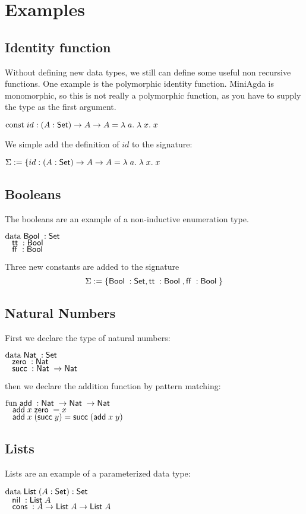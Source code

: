 \section{Examples}
\subsection{Identity function}
Without defining new data types, we still can define some useful non recursive functions.
One example is the polymorphic identity function. 
MiniAgda is monomorphic, so this is not really a polymorphic function, as you have to supply the
type as the first argument.
\begin{bsp}
$\mathrm{const}\; id : ( A : \mathsf{Set} ) \rightarrow{A \rightarrow A} = \lambda\; a .\;\lambda\; x .\;x$   
\end{bsp}
We simple add the definition of $id$ to the signature:
\begin{bsp}
$\mathrm{\Sigma} := \{ id : ( A : \mathsf{Set} ) \rightarrow{A \rightarrow A} = \lambda\; a .\;\lambda\; x .\;x$
\end{bsp}
\subsection{Booleans}
The booleans are an example of a non-inductive enumeration type.
\begin{bsp}
$\mathrm{data}\; \mathsf{Bool}\; : \mathsf{Set}$  \\
$\hspace*{3mm} \mathsf{tt}\; : \mathsf{Bool}\; $\\
$\hspace*{3mm} \mathsf{ff}\; : \mathsf{Bool}\; $
\end{bsp}
Three new constants are added to the signature
\[ \mathrm{\Sigma} := \{ \mathsf{Bool}\; : \mathsf{Set} , \mathsf{tt}\; : \mathsf{Bool}\; , \mathsf{ff}\; : \mathsf{Bool}\; \} \]
\subsection{Natural Numbers}
First we declare the type of natural numbers:
\begin{bsp}
$\mathrm{data}\; \mathsf{Nat}\; : \mathsf{Set}$ \\
$\hspace*{3mm} \mathsf{zero}\; : \mathsf{Nat}\; $\\
$\hspace*{3mm} \mathsf{succ}\; : \mathsf{Nat}\; \rightarrow \mathsf{Nat}\;$
\end{bsp}
then we declare the addition function by pattern matching:
\begin{bsp}
$\mathrm{fun}\; \mathsf{add}\; : \mathsf{Nat}\; \rightarrow \mathsf{Nat}\; \rightarrow \mathsf{Nat}\;$\\
$\hspace*{3mm} \mathsf{add}\; x \; \mathsf{zero}\; = x $\\
$\hspace*{3mm} \mathsf{add}\; x \; (\mathsf{succ}\; y) = \mathsf{succ}\; (\mathsf{add}\; x \; y)  $
\end{bsp}
\subsection{Lists}
Lists are an example of a parameterized data type:
\begin{bsp}
$\mathrm{data}\; \mathsf{List}\; ( A : \mathsf{Set} ) : \mathsf{Set} $ \\
$ \hspace*{3mm} \mathsf{nil}\; : \mathsf{List}\; A  $\\
$ \hspace*{3mm} \mathsf{cons}\; : A \rightarrow \mathsf{List}\; A \rightarrow \mathsf{List}\; A $
\end{bsp}
